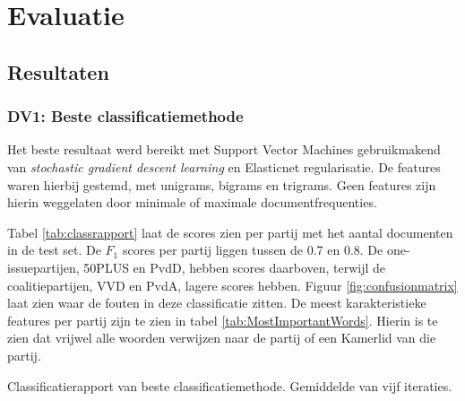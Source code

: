 \section{Evaluatie}
\label{sec:eva}

\subsection{Resultaten}

\subsubsection{DV1: Beste classificatiemethode}
Het beste resultaat werd bereikt met Support Vector Machines gebruikmakend van \textit{stochastic gradient descent learning} en Elasticnet regularisatie. De features waren hierbij gestemd, met unigrams, bigrams en trigrams. Geen features zijn hierin weggelaten door minimale of maximale documentfrequenties. \par
Tabel \ref{tab:classrapport} laat de scores zien per partij met het aantal documenten in de test set. De $F_1$ scores per partij liggen tussen de 0.7 en 0.8. De one-issuepartijen, 50PLUS en PvdD, hebben scores daarboven, terwijl de coalitiepartijen, VVD en PvdA, lagere scores hebben. Figuur \ref{fig:confusionmatrix} laat zien waar de fouten in deze classificatie zitten. De meest karakteristieke features per partij zijn te zien in tabel \ref{tab:MostImportantWords}. Hierin is te zien dat vrijwel alle woorden verwijzen naar de partij of een Kamerlid van die partij.\par

\begin{table}[H]
\caption{Classificatierapport van beste classificatiemethode. Gemiddelde van vijf iteraties.}
\label{tab:classrapport}
\centering

\end{table}


